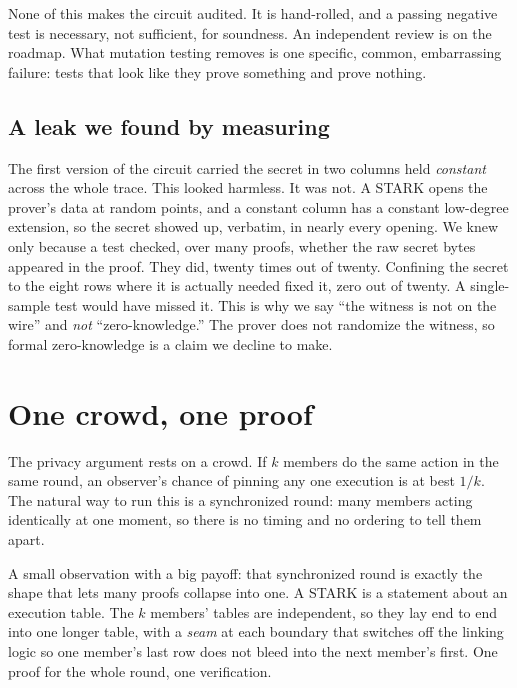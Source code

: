 \documentclass[11pt]{article}
\begin{document}
\begin{honest}
None of this makes the circuit audited. It is hand-rolled, and a passing negative test
is necessary, not sufficient, for soundness. An independent review is on the roadmap.
What mutation testing removes is one specific, common, embarrassing failure: tests that
look like they prove something and prove nothing.
\end{honest}

\subsection{A leak we found by measuring}
\label{sub:leak}

The first version of the circuit carried the secret in two columns held \emph{constant}
across the whole trace. This looked harmless. It was not. A STARK opens the prover's
data at random points, and a constant column has a constant low-degree extension, so the
secret showed up, verbatim, in nearly every opening. We knew only because a test
checked, over many proofs, whether the raw secret bytes appeared in the proof. They did,
twenty times out of twenty. Confining the secret to the eight rows where it is actually
needed fixed it, zero out of twenty. A single-sample test would have missed it. This is
why we say ``the witness is not on the wire'' and \emph{not} ``zero-knowledge.'' The
prover does not randomize the witness, so formal zero-knowledge is a claim we decline to
make.

\section{One crowd, one proof}
\label{sec:round}

The privacy argument rests on a crowd. If $k$ members do the same action in the same
round, an observer's chance of pinning any one execution is at best $1/k$. The natural
way to run this is a synchronized round: many members acting identically at one moment,
so there is no timing and no ordering to tell them apart.

A small observation with a big payoff: that synchronized round is exactly the shape that
lets many proofs collapse into one. A STARK is a statement about an execution table. The
$k$ members' tables are independent, so they lay end to end into one longer table, with
a \emph{seam} at each boundary that switches off the linking logic so one member's last
row does not bleed into the next member's first. One proof for the whole round, one
verification.
\end{document}
